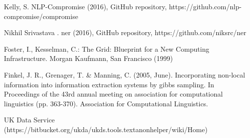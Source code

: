 \documentclass{article}
\begin{document}
\begin{thebibliography}{4}

 Kelly, S. NLP-Compromise (2016), GitHub repository, https://github.com/nlp- compromise/compromise

 Nikhil Srivastava . ner (2016), GitHub repository, https://github.com/niksrc/ner

 Foster, I., Kesselman, C.: The Grid: Blueprint for a New Computing
Infrastructure. Morgan Kaufmann, San Francisco (1999)

 Finkel, J. R., Grenager, T. \& Manning, C. (2005, June). Incorporating non-local information into information extraction systems by gibbs sampling. In Proceedings of the 43rd annual meeting on association for computational linguistics (pp. 363-370). Association for
Computational Linguistics.

 UK Data Service \\(https://bitbucket.org/ukda/ukds.tools.textanonhelper/wiki/Home)

\end{thebibliography}
\end{document}
